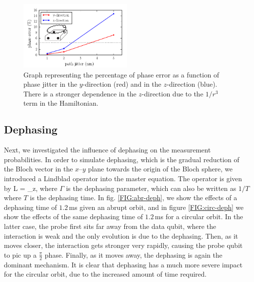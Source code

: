 \begin{figure}[h]
  \centering
    \includegraphics[width=0.5\textwidth]{../Figures/path_jit.pdf}
      \caption{Graph representing the percentage of phase error as a function of phase jitter in the $y$-direction (red) and in the $z$-direction (blue). There is a stronger dependence in the $z$-direction due to the $1/r^3$ term in the Hamiltonian.}
      \label{fig:pathjitter}
\end{figure}







\subsection{Dephasing}\label{sec:dephasing}
Next, we investigated the influence of dephasing on the measurement probabilities. In order to simulate dephasing, which is the gradual reduction of the Bloch vector in the $x$--$y$ plane towards the origin of the Bloch sphere, we introduced a Lindblad operator into the master equation. The operator is given by 
\beq
L  = \sqrt{\Gamma} \sigma_z,
\eeq
where $\Gamma$ is the dephasing parameter, which can also be written as $1/T$ where $T$ is the dephasing time. In fig. \ref{FIG:abr-deph}, we show the effects of a dephasing time of $1.2\, $ms given an abrupt orbit, and in figure \ref{FIG:circ-deph} we show the effects of the same dephasing time of $1.2\, $ms for a circular orbit. In the latter case, the probe first sits far away from the data qubit, where the interaction is weak and the only evolution is due to the dephasing. Then, as it moves closer, the interaction gets stronger very rapidly, causing the probe qubit to pic up a $\frac{\pi}{2}$ phase. Finally, as it moves away, the dephasing is again the dominant mechanism. 
It is clear that dephasing has a much more severe impact for the circular orbit, due to the increased amount of time required. 

